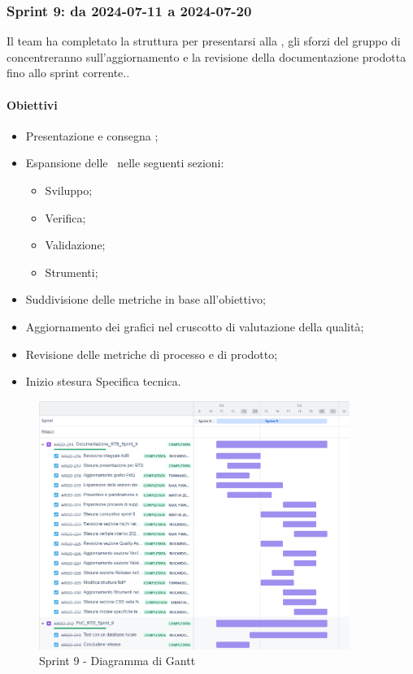 \subsubsection{Sprint 9: da 2024-07-11 a 2024-07-20}
\par Il team ha completato la struttura per presentarsi alla , gli sforzi del gruppo di concentreranno sull’aggiornamento e la revisione della documentazione prodotta fino allo sprint corrente..

\paragraph{Obiettivi}
\begin{itemize}
  \item Presentazione e consegna ;
  \item Espansione delle \NdP\ nelle seguenti sezioni:
  \begin{itemize}
    \item Sviluppo;
    \item Verifica;
    \item Validazione;
    \item Strumenti;
  \end{itemize}
  \item Suddivisione delle metriche in base all’obiettivo;
  \item Aggiornamento dei grafici nel cruscotto di valutazione della qualità;
  \item Revisione delle metriche di processo e di prodotto;
  \item Inizio stesura Specifica tecnica.
\end{itemize}

\begin{figure}[H]
  \centering
  \includegraphics[width=0.90\textwidth]{assets/Pianificazione/Sprint-9/gantt.png}
  \caption{Sprint 9 - Diagramma di Gantt}\label{fig:sprint-9-gantt}
\end{figure}

